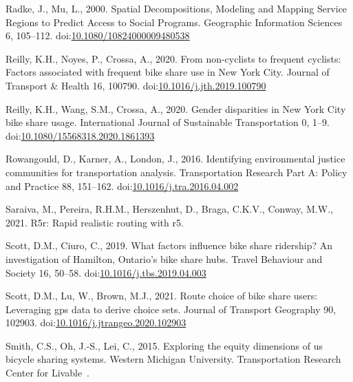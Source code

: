 \documentclass[]{elsarticle} %
\begin{document}
\leavevmode\hypertarget{ref-radkeSpatialDecompositionsModeling2000}{}%
Radke, J., Mu, L., 2000. Spatial Decompositions, Modeling and Mapping
Service Regions to Predict Access to Social Programs. Geographic
Information Sciences 6, 105--112.
doi:\href{https://doi.org/10.1080/10824000009480538}{10.1080/10824000009480538}

\leavevmode\hypertarget{ref-reillyNoncyclistsFrequentCyclists2020}{}%
Reilly, K.H., Noyes, P., Crossa, A., 2020. From non-cyclists to frequent
cyclists: Factors associated with frequent bike share use in New York
City. Journal of Transport \& Health 16, 100790.
doi:\href{https://doi.org/10.1016/j.jth.2019.100790}{10.1016/j.jth.2019.100790}

\leavevmode\hypertarget{ref-reillyGenderDisparitiesNew2020}{}%
Reilly, K.H., Wang, S.M., Crossa, A., 2020. Gender disparities in New
York City bike share usage. International Journal of Sustainable
Transportation 0, 1--9.
doi:\href{https://doi.org/10.1080/15568318.2020.1861393}{10.1080/15568318.2020.1861393}

\leavevmode\hypertarget{ref-rowangouldIdentifyingEnvironmentalJustice2016}{}%
Rowangould, D., Karner, A., London, J., 2016. Identifying environmental
justice communities for transportation analysis. Transportation Research
Part A: Policy and Practice 88, 151--162.
doi:\href{https://doi.org/10.1016/j.tra.2016.04.002}{10.1016/j.tra.2016.04.002}

\leavevmode\hypertarget{ref-R-r5r}{}%
Saraiva, M., Pereira, R.H.M., Herszenhut, D., Braga, C.K.V., Conway,
M.W., 2021. R5r: Rapid realistic routing with r5.

\leavevmode\hypertarget{ref-scottWhatFactorsInfluence2019}{}%
Scott, D.M., Ciuro, C., 2019. What factors influence bike share
ridership? An investigation of Hamilton, Ontario's bike share hubs.
Travel Behaviour and Society 16, 50--58.
doi:\href{https://doi.org/10.1016/j.tbs.2019.04.003}{10.1016/j.tbs.2019.04.003}

\leavevmode\hypertarget{ref-scottRouteChoiceBike2021}{}%
Scott, D.M., Lu, W., Brown, M.J., 2021. Route choice of bike share
users: Leveraging gps data to derive choice sets. Journal of Transport
Geography 90, 102903.
doi:\href{https://doi.org/10.1016/j.jtrangeo.2020.102903}{10.1016/j.jtrangeo.2020.102903}

\leavevmode\hypertarget{ref-smith2015exploring}{}%
Smith, C.S., Oh, J.-S., Lei, C., 2015. Exploring the equity dimensions
of us bicycle sharing systems. Western Michigan University.
Transportation Research Center for Livable~.
\end{document}
